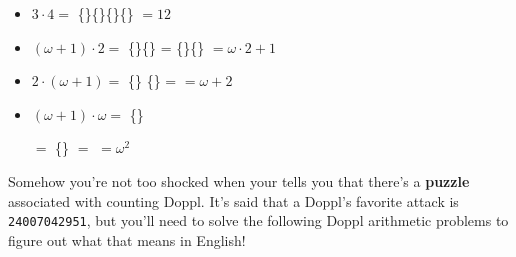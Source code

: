 \begin{itemize}
\item \(3\cdot 4=\)
\{\mappDoppl\mappDoppl\mappDoppl\}\{\mappDoppl\mappDoppl\mappDoppl\}\{\mappDoppl\mappDoppl\mappDoppl\}\{\mappDoppl\mappDoppl\mappDoppl\} \(=12\)

\item \((\omega+1)\cdot 2=\)
\{\mappDopplOmega\mappDoppl\}\{\mappDopplOmega\mappDoppl\} =
\{\mappDopplOmega\}\{\mappDoppl\mappDopplOmega\}\mappDoppl{} \(=\omega\cdot 2+1\)

\item \(2\cdot(\omega+1)=\)
\{\mappDoppl\mappDoppl\}%
\resizebox{0.4in}{!}{\{\mappDoppl\mappDoppl\}}%
\resizebox{0.3in}{!}{\{\mappDoppl\mappDoppl\}}%
\resizebox{0.2in}{!}{\{\mappDoppl\mappDoppl\}}%
\resizebox{0.1in}{!}{\{\mappDoppl\mappDoppl\}}%
\{\mappDoppl\mappDoppl\} =
\mappDopplOmega\mappDoppl\mappDoppl \(=\omega+2\)

\item \((\omega+1)\cdot \omega=\)
\{\mappDopplOmega\mappDoppl\}%
\resizebox{0.6in}{!}{\{\mappDopplOmega\mappDoppl\}}%
\resizebox{0.5in}{!}{\{\mappDopplOmega\mappDoppl\}}%
\resizebox{0.4in}{!}{\{\mappDopplOmega\mappDoppl\}}%
\resizebox{0.3in}{!}{\{\mappDopplOmega\mappDoppl\}}%
\resizebox{0.2in}{!}{\{\mappDopplOmega\mappDoppl\}}%
\resizebox{0.1in}{!}{\{\mappDopplOmega\mappDoppl\}}%

\hspace{0.7in}
\(=\)
\{\mappDopplOmega\}%
\resizebox{0.6in}{!}{\{\mappDoppl\mappDopplOmega\}}%
\resizebox{0.5in}{!}{\{\mappDoppl\mappDopplOmega\}}%
\resizebox{0.4in}{!}{\{\mappDoppl\mappDopplOmega\}}%
\resizebox{0.3in}{!}{\{\mappDoppl\mappDopplOmega\}}%
\resizebox{0.2in}{!}{\{\mappDoppl\mappDopplOmega\}}%
\resizebox{0.1in}{!}{\{\mappDoppl\mappDopplOmega\}}%
\(=\)
\mappDopplOmegaSquared \(=\omega^2\)
\end{itemize}


Somehow you're not too shocked when your \mappMobidex{} tells you that
there's a \textbf{puzzle} associated with counting Doppl. It's said
that a Doppl's favorite \mappMobidot{} attack is \texttt{24007042951},
but you'll need to solve the following Doppl arithmetic problems to
figure out what that means in English!

